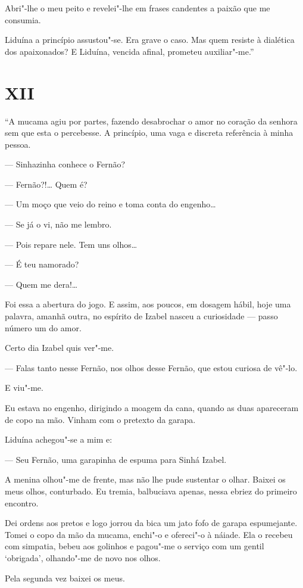 Abri"-lhe o meu peito e revelei"-lhe em frases candentes a paixão que me
consumia.

Liduína a princípio assustou"-se. Era grave o caso. Mas quem resiste à
dialética dos apaixonados? E Liduína, vencida afinal, prometeu
auxiliar"-me.''

\section*{XII}

``A mucama agiu por partes, fazendo desabrochar o amor no coração da
senhora sem que esta o percebesse. A princípio, uma vaga e discreta
referência à minha pessoa.

--- Sinhazinha conhece o Fernão?

--- Fernão?!\ldots{} Quem é?

--- Um moço que veio do reino e toma conta do engenho\ldots{}

--- Se já o vi, não me lembro.

--- Pois repare nele. Tem uns olhos\ldots{}

--- É teu namorado?

--- Quem me dera!\ldots{}

Foi essa a abertura do jogo. E assim, aos poucos, em dosagem hábil, hoje
uma palavra, amanhã outra, no espírito de Izabel nasceu a curiosidade
--- passo número um do amor.

Certo dia Izabel quis ver"-me.

--- Falas tanto nesse Fernão, nos olhos desse Fernão, que estou curiosa
de vê"-lo.

E viu"-me.

Eu estava no engenho, dirigindo a moagem da cana, quando as duas
apareceram de copo na mão. Vinham com o pretexto da garapa.

Liduína achegou"-se a mim e:

--- Seu Fernão, uma garapinha de espuma para Sinhá Izabel.

A menina olhou"-me de frente, mas não lhe pude sustentar o olhar. Baixei
os meus olhos, conturbado. Eu tremia, balbuciava apenas, nessa ebriez do
primeiro encontro.

Dei ordens aos pretos e logo jorrou da bica um jato fofo de garapa
espumejante. Tomei o copo da mão da mucama, enchi"-o e ofereci"-o à
náiade. Ela o recebeu com simpatia, bebeu aos golinhos e pagou"-me o
serviço com um gentil `obrigada', olhando"-me de novo nos olhos.

Pela segunda vez baixei os meus.

